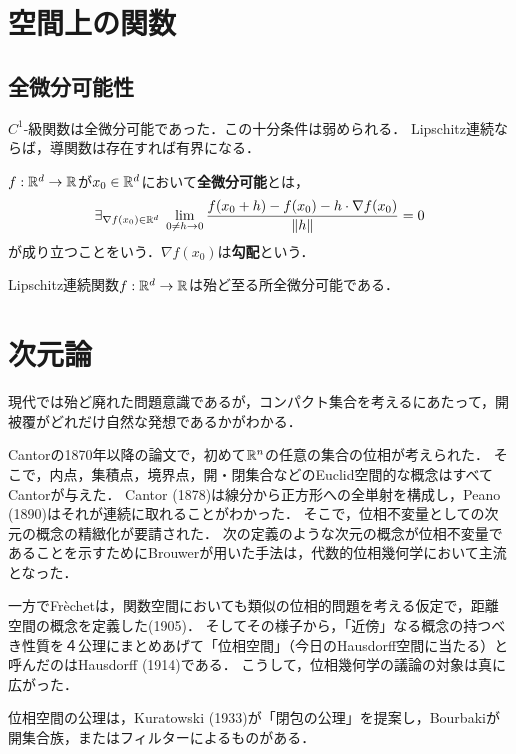 \documentclass[uplatex,dvipdfmx]{jsreport}
\begin{document}
\section{空間上の関数}


\subsection{全微分可能性}

\begin{tcolorbox}[colframe=ForestGreen, colback=ForestGreen!10!white,breakable,colbacktitle=ForestGreen!40!white,coltitle=black,fonttitle=\bfseries\sffamily,
title=]
    $C^1$-級関数は全微分可能であった．この十分条件は弱められる．
    Lipschitz連続ならば，導関数は存在すれば有界になる．
\end{tcolorbox}

\begin{definition}
    $f:\mathbb{R}^d\to\mathbb{R}$が$x_0\in\mathbb{R}^d$において\textbf{全微分可能}とは，
    \[\exists_{\nabla f(x_0)\in\mathbb{R}^d}\;\lim_{0\ne h\to 0}\frac{f(x_0+h)-f(x_0)-h\cdot\nabla f(x_0)}{\|h\|}=0\]
    が成り立つことをいう．$\nabla f(x_0)$は\textbf{勾配}という．
\end{definition}

\begin{theorem}
    Lipschitz連続関数$f:\mathbb{R}^d\to\mathbb{R}$は殆ど至る所全微分可能である．
\end{theorem}


\section{次元論}

\begin{tcolorbox}[colframe=ForestGreen, colback=ForestGreen!10!white,breakable,colbacktitle=ForestGreen!40!white,coltitle=black,fonttitle=\bfseries\sffamily,
title=]
    現代では殆ど廃れた問題意識であるが，コンパクト集合を考えるにあたって，開被覆がどれだけ自然な発想であるかがわかる．
\end{tcolorbox}

\begin{history}
    Cantorの1870年以降の論文で，初めて$\mathbb{R}^n$の任意の集合の位相が考えられた．
    そこで，内点，集積点，境界点，開・閉集合などのEuclid空間的な概念はすべてCantorが与えた．
    Cantor (1878)は線分から正方形への全単射を構成し，Peano (1890)はそれが連続に取れることがわかった．
    そこで，位相不変量としての次元の概念の精緻化が要請された．
    次の定義のような次元の概念が位相不変量であることを示すためにBrouwerが用いた手法は，代数的位相幾何学において主流となった．

    一方でFr\`{e}chetは，関数空間においても類似の位相的問題を考える仮定で，距離空間の概念を定義した(1905)．
    そしてその様子から，「近傍」なる概念の持つべき性質を４公理にまとめあげて「位相空間」（今日のHausdorff空間に当たる）と呼んだのはHausdorff (1914)である．
    こうして，位相幾何学の議論の対象は真に広がった．

    位相空間の公理は，Kuratowski (1933)が「閉包の公理」を提案し，Bourbakiが開集合族，またはフィルターによるものがある．
    
\end{history}
\end{document}
